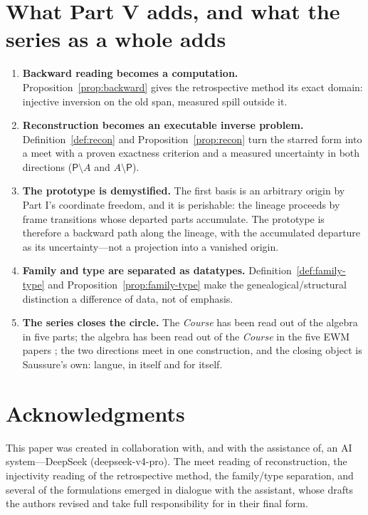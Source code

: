 \documentclass[11pt,a4paper]{article}
\theoremstyle{remark}
\newcommand{\Proto}{\ensuremath{\mathsf{P}}}             %
\begin{document}
\FloatBarrier
\section{What Part V adds, and what the series as a whole adds}
\label{sec:adds}

\begin{enumerate}[leftmargin=*,nosep]
  \item \textbf{Backward reading becomes a computation.}
    Proposition~\ref{prop:backward} gives the retrospective method its exact
    domain: injective inversion on the old span, measured spill outside it.
  \item \textbf{Reconstruction becomes an executable inverse problem.}
    Definition~\ref{def:recon} and Proposition~\ref{prop:recon} turn the
    starred form into a meet with a proven exactness criterion and a measured
    uncertainty in both directions ($\Proto \setminus A$ and
    $A \setminus \Proto$).
  \item \textbf{The prototype is demystified.} The first basis is an
    arbitrary origin by Part I's coordinate freedom, and it is perishable:
    the lineage proceeds by frame transitions whose departed parts
    accumulate. The prototype is therefore a backward path along the
    lineage, with the accumulated departure as its uncertainty---not a
    projection into a vanished origin.
  \item \textbf{Family and type are separated as datatypes.}
    Definition~\ref{def:family-type} and Proposition~\ref{prop:family-type}
    make the genealogical/structural distinction a difference of data, not
    of emphasis.
  \item \textbf{The series closes the circle.} The \textit{Course} has been
    read out of the algebra in five parts; the algebra has been read out of
    the \textit{Course} in the five EWM papers \cite{ewm2026,companion2026,
    state2026,attention2026,langue2026}; the two directions meet in one
    construction, and the closing object is Saussure's own: langue, in
    itself and for itself.
\end{enumerate}

\section*{Acknowledgments}
This paper was created in collaboration with, and with the assistance of, an
AI system---DeepSeek (deepseek-v4-pro). The meet reading of reconstruction,
the injectivity reading of the retrospective method, the family/type
separation, and several of the formulations emerged in dialogue with the
assistant, whose drafts the authors revised and take full responsibility for
in their final form.
\end{document}
